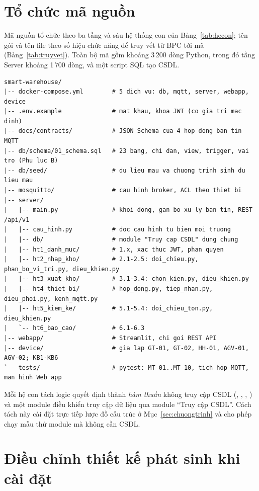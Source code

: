 \section{Tổ chức mã nguồn}
\label{sec:tochucma}

Mã nguồn tổ chức theo ba tầng và sáu hệ thống con của Bảng~\ref{tab:hecon}; tên gói và tên file theo số hiệu chức năng để truy vết từ BPC tới mã (Bảng~\ref{tab:truyvet}). Toàn bộ mã gồm khoảng 3\,200 dòng Python, trong đó tầng Server khoảng 1\,700 dòng, và một script SQL tạo CSDL.

\begin{lstlisting}[basicstyle=\ttfamily\scriptsize]
smart-warehouse/
|-- docker-compose.yml        # 5 dich vu: db, mqtt, server, webapp, device
|-- .env.example              # mat khau, khoa JWT (co gia tri mac dinh)
|-- docs/contracts/           # JSON Schema cua 4 hop dong ban tin MQTT
|-- db/schema/01_schema.sql   # 23 bang, chi dan, view, trigger, vai tro (Phu luc B)
|-- db/seed/                  # du lieu mau va chuong trinh sinh du lieu mau
|-- mosquitto/                # cau hinh broker, ACL theo thiet bi
|-- server/
|   |-- main.py               # khoi dong, gan bo xu ly ban tin, REST /api/v1
|   |-- cau_hinh.py           # doc cau hinh tu bien moi truong
|   |-- db/                   # module "Truy cap CSDL" dung chung
|   |-- ht1_danh_muc/         # 1.x, xac thuc JWT, phan quyen
|   |-- ht2_nhap_kho/         # 2.1-2.5: doi_chieu.py, phan_bo_vi_tri.py, dieu_khien.py
|   |-- ht3_xuat_kho/         # 3.1-3.4: chon_kien.py, dieu_khien.py
|   |-- ht4_thiet_bi/         # hop_dong.py, tiep_nhan.py, dieu_phoi.py, kenh_mqtt.py
|   |-- ht5_kiem_ke/          # 5.1-5.4: doi_chieu_ton.py, dieu_khien.py
|   `-- ht6_bao_cao/          # 6.1-6.3
|-- webapp/                   # Streamlit, chi goi REST API
|-- device/                   # gia lap GT-01, GT-02, HH-01, AGV-01, AGV-02; KB1-KB6
`-- tests/                    # pytest: MT-01..MT-10, tich hop MQTT, man hinh Web app
\end{lstlisting}

Mỗi hệ con tách logic quyết định thành \emph{hàm thuần} không truy cập CSDL (, , , ) và một module điều khiển truy cập dữ liệu qua module “Truy cập CSDL”. Cách tách này cài đặt trực tiếp lược đồ cấu trúc ở Mục~\ref{sec:chuongtrinh} và cho phép chạy mẫu thử module mà không cần CSDL.

\section{Điều chỉnh thiết kế phát sinh khi cài đặt}
\label{sec:dieuchinh}


